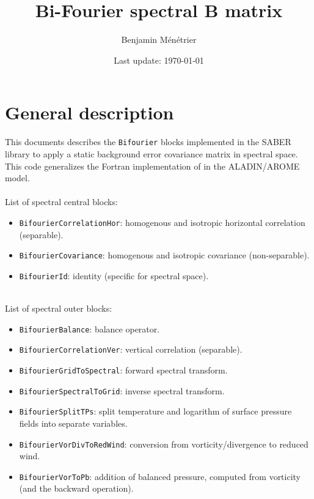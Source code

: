 \documentclass[12pt]{scrartcl}
\begin{document}
\title{Bi-Fourier spectral B matrix}
\author{Benjamin Ménétrier}
\date{Last update: \today}

\thispagestyle{empty}

\maketitle

\tableofcontents

\clearpage

\section{General description}

This documents describes the \texttt{Bifourier} blocks implemented in the SABER library to apply a static background error covariance matrix in spectral space. This code generalizes the Fortran implementation of \cite{berre_2000} in the ALADIN/AROME model.\\
$  $\\
List of spectral central blocks:
\begin{itemize}
\item \texttt{BifourierCorrelationHor}: homogenous and isotropic horizontal correlation (separable).
\item \texttt{BifourierCovariance}: homogenous and isotropic covariance (non-separable).
\item \texttt{BifourierId}: identity (specific for spectral space).
\end{itemize}
$  $\\
List of spectral outer blocks:
\begin{itemize}
\item \texttt{BifourierBalance}: balance operator.
\item \texttt{BifourierCorrelationVer}: vertical correlation (separable).
\item \texttt{BifourierGridToSpectral}: forward spectral transform.
\item \texttt{BifourierSpectralToGrid}: inverse spectral transform.
\item \texttt{BifourierSplitTPs}: split temperature and logarithm of surface pressure fields into separate variables.
\item \texttt{BifourierVorDivToRedWind}: conversion from vorticity/divergence to reduced wind.
\item \texttt{BifourierVorToPb}: addition of balanced pressure, computed from vorticity (and the backward operation).
\end{itemize}
\end{document}
